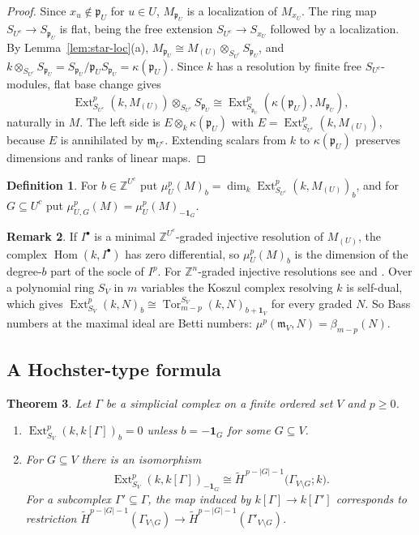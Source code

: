 \documentclass[11pt]{article}
\theoremstyle{plain}
\newtheorem{theorem}{Theorem}[section]
\theoremstyle{definition}
\newtheorem{definition}[theorem]{Definition}
\newtheorem{remark}[theorem]{Remark}
\newcommand{\kk}{k}
\newcommand{\ZZ}{\mathbb{Z}}
\newcommand{\pp}{\mathfrak{p}}
\newcommand{\mm}{\mathfrak{m}}
\newcommand{\Ext}{\operatorname{Ext}}
\newcommand{\Tor}{\operatorname{Tor}}
\newcommand{\rH}{\widetilde{H}}
\newcommand{\one}{\mathbf 1}
\begin{document}
\begin{proof}
Since $x_u\notin\pp_U$ for $u\in U$, $M_{\pp_U}$ is a localization of $M_{x_U}$. The ring map
$S_{U^c}\to S_{\pp_U}$ is flat, being the free extension $S_{U^c}\to S_{x_U}$ followed by a localization.
By Lemma~\ref{lem:star-loc}(a), $M_{\pp_U}\cong M_{(U)}\otimes_{S_{U^c}}S_{\pp_U}$, and
$\kk\otimes_{S_{U^c}}S_{\pp_U}=S_{\pp_U}/\pp_US_{\pp_U}=\kappa(\pp_U)$. Since $\kk$ has a resolution by finite
free $S_{U^c}$-modules, flat base change gives
\[
\Ext^p_{S_{U^c}}(\kk,M_{(U)})\otimes_{S_{U^c}}S_{\pp_U}\cong\Ext^p_{S_{\pp_U}}(\kappa(\pp_U),M_{\pp_U}),
\]
naturally in $M$. The left side is $E\otimes_\kk\kappa(\pp_U)$ with $E=\Ext^p_{S_{U^c}}(\kk,M_{(U)})$, because
$E$ is annihilated by $\mm_{U^c}$. Extending scalars from $\kk$ to $\kappa(\pp_U)$ preserves dimensions and
ranks of linear maps.
\end{proof}

\begin{definition}\label{def:graded-bass}
For $b\in\ZZ^{U^c}$ put $\mu^p_U(M)_b=\dim_\kk\Ext^p_{S_{U^c}}(\kk,M_{(U)})_b$, and for $G\subseteq U^c$ put
$\mu^p_{U,G}(M)=\mu^p_U(M)_{-\one_G}$.
\end{definition}

\begin{remark}\label{rem:koszul-duality}
If $I^\bullet$ is a minimal $\ZZ^{U^c}$-graded injective resolution of $M_{(U)}$, the complex
$\operatorname{Hom}(\kk,I^\bullet)$ has zero differential, so $\mu^p_U(M)_b$ is the dimension of the degree-$b$
part of the socle of $I^p$. For $\ZZ^n$-graded injective resolutions see \cite{GotoWatanabe} and
\cite[Ch.~11]{MillerSturmfels}. Over a polynomial ring $S_V$ in $m$ variables the Koszul complex resolving $\kk$
is self-dual, which gives $\Ext^p_{S_V}(\kk,N)_b\cong\Tor^{S_V}_{m-p}(\kk,N)_{b+\one_V}$ for every graded $N$.
So Bass numbers at the maximal ideal are Betti numbers: $\mu^p(\mm_V,N)=\beta_{m-p}(N)$.
\end{remark}

\subsection{A Hochster-type formula}

\begin{theorem}\label{thm:bass-static}
Let $\Gamma$ be a simplicial complex on a finite ordered set $V$ and $p\ge0$.
\begin{enumerate}[label=\textup{(\alph*)},nosep]
\item $\Ext^p_{S_V}(\kk,\kk[\Gamma])_b=0$ unless $b=-\one_G$ for some $G\subseteq V$.
\item For $G\subseteq V$ there is an isomorphism
\[
\Ext^p_{S_V}(\kk,\kk[\Gamma])_{-\one_G}\cong\rH^{\,p-|G|-1}\bigl(\Gamma_{V\setminus G};\kk\bigr).
\]
For a subcomplex $\Gamma'\subseteq\Gamma$, the map induced by $\kk[\Gamma]\to\kk[\Gamma']$ corresponds to
restriction $\rH^{p-|G|-1}(\Gamma_{V\setminus G})\to\rH^{p-|G|-1}(\Gamma'_{V\setminus G})$.
\end{enumerate}
\end{theorem}
\end{document}
